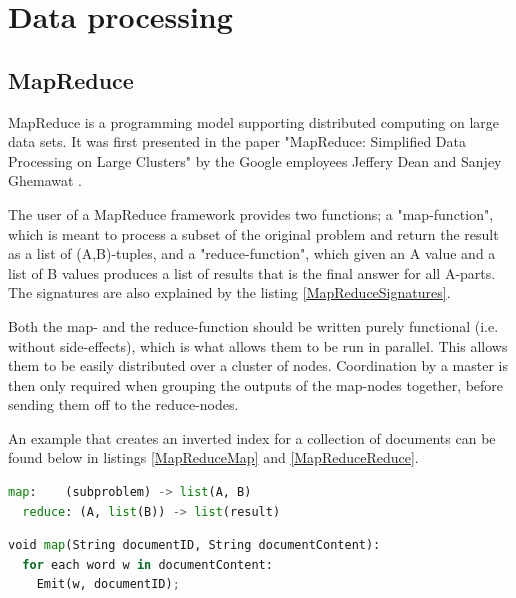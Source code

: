 \section{Data processing}

\subsection{MapReduce} \label{subsec:MapReduce}

MapReduce is a programming model supporting distributed computing on large data sets. It was first presented in the paper "MapReduce: Simplified Data Processing on Large Clusters" by the Google employees Jeffery Dean and Sanjey Ghemawat \cite{MapReduce}.

The user of a MapReduce framework provides two functions; a "map-function", which is meant to process a subset of the original problem and return the result as a list of (A,B)-tuples, and a "reduce-function", which given an A value and a list of B values produces a list of results that is the final answer for all A-parts. The signatures are also explained by the listing \ref{MapReduceSignatures}.

Both the map- and the reduce-function should be written purely functional (i.e. without side-effects), which is what allows them to be run in parallel. This allows them to be easily distributed over a cluster of nodes. Coordination by a master is then only required when grouping the outputs of the map-nodes together, before sending them off to the reduce-nodes. 

An example that creates an inverted index for a collection of documents can be found below in listings \ref{MapReduceMap} and \ref{MapReduceReduce}.

\begin{lstlisting}[language=Python,caption={Signatures for the map and reduce functions},captionpos=b, label={MapReduceSignatures}]
  map:    (subproblem) -> list(A, B)
  reduce: (A, list(B)) -> list(result)
\end{lstlisting}

\begin{lstlisting}[language=Python,caption={An example map function, in pseudo-code.},captionpos=b, label={MapReduceMap}]
 void map(String documentID, String documentContent):
  for each word w in documentContent:
    Emit(w, documentID);
\end{lstlisting}


